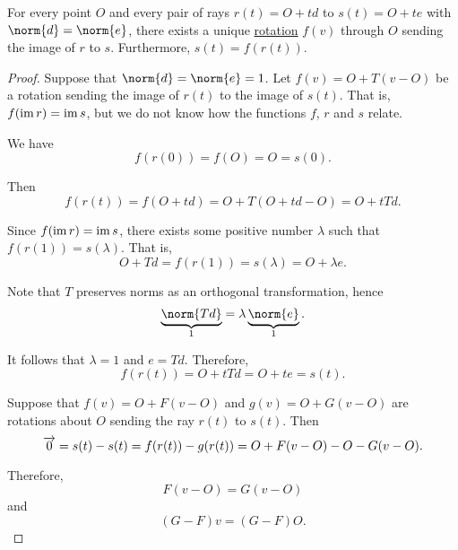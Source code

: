 \begin{proposition}\label{thm:plane_ray_rotation}
  For every point \( O \) and every pair of rays \( r(t) = O + td \) to \( s(t) = O + te \) with \( \norm{d} = \norm{e} \), there exists a unique \hyperref[def:rigid_motion/rotation]{rotation} \( f(v) \) through \( O \) sending the image of \( r \) to \( s \). Furthermore, \( s(t) = f(r(t)) \).
\end{proposition}
\begin{proof}
   Suppose that \( \norm{d} = \norm{e} = 1 \). Let \( f(v) = O + T(v - O) \) be a rotation sending the image of \( r(t) \) to the image of \( s(t) \). That is, \( f(\operatorname{im} r) = \operatorname{im} s \), but we do not know how the functions \( f \), \( r \) and \( s \) relate.

  We have
  \begin{equation*}
    f(r(0)) = f(O) = O = s(0).
  \end{equation*}

  Then
  \begin{equation*}
    f(r(t)) = f(O + td) = O + T(O + td - O) = O + t Td.
  \end{equation*}

  Since \( f(\operatorname{im} r) = \operatorname{im} s \), there exists some positive number \( \lambda \) such that \( f(r(1)) = s(\lambda) \). That is,
  \begin{equation*}
    O + Td = f(r(1)) = s(\lambda) = O + \lambda e.
  \end{equation*}

  Note that \( T \) preserves norms as an orthogonal transformation, hence
  \begin{equation*}
    \underbrace{\norm{Td}}_{1} = \lambda \underbrace{\norm{e}}_{1}.
  \end{equation*}

  It follows that \( \lambda = 1 \) and \( e = Td \). Therefore,
  \begin{equation*}
    f(r(t)) = O + t Td = O + te = s(t).
  \end{equation*}

  \UniquenessSubProof Suppose that \( f(v) = O + F(v - O) \) and \( g(v) = O + G(v - O) \) are rotations about \( O \) sending the ray \( r(t) \) to \( s(t) \). Then
  \begin{equation*}
    \overrightarrow{0} = s(t) - s(t) = f(r(t)) - g(r(t)) = O + F(v - O) - O - G(v - O).
  \end{equation*}

  Therefore,
  \begin{equation*}
    F(v - O) = G(v - O)
  \end{equation*}
  and
  \begin{equation*}
    (G - F) v = (G - F) O.
  \end{equation*}


\end{proof}
